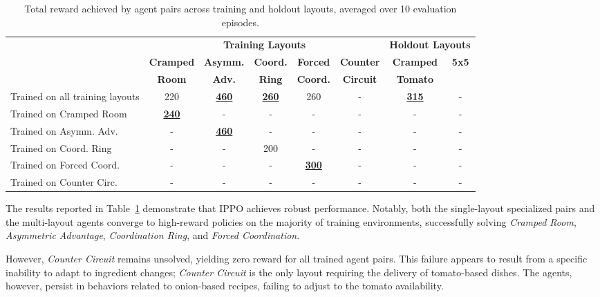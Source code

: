 \documentclass{article}
\begin{document}
\begin{table}[ht]
    \small
    \centering
    \setlength{\tabcolsep}{4pt} 
    \caption{Total reward achieved by agent pairs across training and holdout
    layouts, averaged over 10 evaluation episodes.}
    \label{tab:agent_performance}
    \begin{tabular}{l ccccc cc}
        \toprule
        & \multicolumn{5}{c}{\textbf{Training Layouts}} & \multicolumn{2}{c}{\textbf{Holdout Layouts}} \\
        \cmidrule(lr){2-6} \cmidrule(lr){7-8}
        
               & \textbf{Cramped} & \textbf{Asymm.} & \textbf{Coord.} & \textbf{Forced} & \textbf{Counter} & \textbf{Cramped} & \textbf{5x5} \\
                        & \textbf{Room}    & \textbf{Adv.}   & \textbf{Ring}   & \textbf{Coord.} & \textbf{Circuit} & \textbf{Tomato}  & \\
        \midrule

        Trained on all training layouts   & 220 & \underline{\textbf{460}} & \underline{\textbf{260}} & 260 & - & \underline{\textbf{315}} & - \\
        \midrule
        Trained on Cramped Room  & \underline{\textbf{240}} & - & - & - & - & - & - \\
        Trained on Asymm. Adv.   & - & \underline{\textbf{460}} & - & - & - & - & - \\
        Trained on Coord. Ring   & - & - & 200 & - & - & - & - \\
        Trained on Forced Coord. & - & - & - & \underline{\textbf{300}} & - & - & - \\
        Trained on Counter Circ. & - & - & - & - & - & - & - \\

        \bottomrule
    \end{tabular}
\end{table}

The results reported in Table~\ref{tab:agent_performance} demonstrate that
IPPO achieves robust performance. Notably, both the single-layout specialized
pairs and the multi-layout agents converge to high-reward policies on the
majority of training environments, successfully solving \textit{Cramped Room},
\textit{Asymmetric Advantage}, \textit{Coordination Ring}, and \textit{Forced
Coordination}.

However, \textit{Counter Circuit} remains unsolved, yielding zero reward for
all trained agent pairs. This failure appears to result from a specific
inability to adapt to ingredient changes; \textit{Counter Circuit} is the only
layout requiring the delivery of tomato-based dishes. The agents, however,
persist in behaviors related to onion-based recipes, failing to adjust to the
tomato availability.
\end{document}
